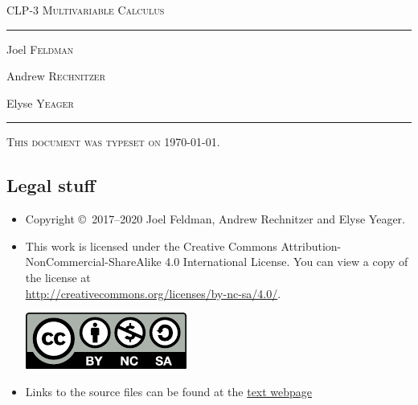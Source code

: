 \documentclass[12pt,letterpaper, openany]{book}
\begin{document}
\setcounter{page}{0}

\begin{titlepage} 
\begin{center} 
\textsc{\LARGE
CLP-3 Multivariable Calculus
}\\[2ex]

\vspace{5ex}
\hrule
\vspace{5ex}

\begin{minipage}[t]{0.3\textwidth} \begin{flushleft}
\large Joel \textsc{Feldman}
\end{flushleft} \end{minipage}%
\begin{minipage}[t]{0.3\textwidth} \begin{flushleft}
\large Andrew \textsc{Rechnitzer}
\end{flushleft} \end{minipage}%
\begin{minipage}[t]{0.3\textwidth} \begin{flushright}
\large Elyse \textsc{Yeager}
\end{flushright} \end{minipage}%
\end{center}
\vspace{2ex}
\hrule

\vfill
\textsc{This document was typeset on \today.}
\end{titlepage}

\subsection*{Legal stuff}
\begin{itemize}
 \item Copyright \copyright\ 2017--2020 Joel Feldman, Andrew Rechnitzer and Elyse Yeager.
\item This work is licensed under the
Creative Commons Attribution-NonCommercial-ShareAlike 4.0 International
License. You can view a copy of the license at \\
\url{http://creativecommons.org/licenses/by-nc-sa/4.0/}.
\begin{center}
 \includegraphics{by-nc-sa.pdf}
\end{center}
\item Links to the source files can be found at the \href{http://www.math.ubc.ca/~CLP/index.html}{text webpage}
\end{itemize}
\end{document}
